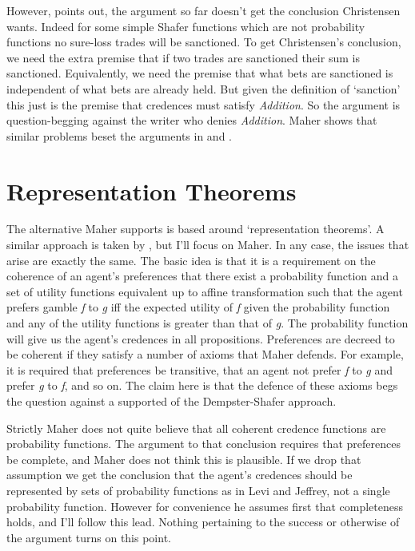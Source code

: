 However, \citet[301-3]{Maher1997} points out, the argument so far doesn't get the conclusion Christensen wants. Indeed for some simple Shafer functions which are not probability functions no sure\nobreakdash-loss trades will be sanctioned. To get Christensen's conclusion, we need the extra premise that if two trades are sanctioned their sum is sanctioned. Equivalently, we need the premise that what bets are sanctioned is independent of what bets are already held. But given the definition of `sanction' this just is the premise that credences must satisfy \textit{Addition}. So the argument is question-begging against the writer who denies \textit{Addition}. Maher shows that similar problems beset the arguments in \citet{HowsonUrbach1989} and \citet{Hellman1997}.

\section{Representation Theorems}
The alternative Maher supports is based around `representation theorems'. A similar approach is taken by \citet{Kaplan1996}, but I'll focus on Maher. In any case, the issues that arise are exactly the same. The basic idea is that it is a requirement on the coherence of an agent's preferences that there exist a probability function and a set of utility functions equivalent up to affine transformation such that the agent prefers gamble \textit{f} to \textit{g} iff the expected utility of \textit{f} given the probability function and any of the utility functions is greater than that of \textit{g}. The probability function will give us the agent's credences in all propositions. Preferences are decreed to be coherent if they satisfy a number of axioms that Maher defends. For example, it is required that preferences be transitive, that an agent not prefer \textit{f} to \textit{g} and prefer \textit{g} to \textit{f}, and so on. The claim here is that the defence of these axioms begs the question against a supported of the Dempster-Shafer approach.

Strictly Maher does not quite believe that all coherent credence functions are probability functions. The argument to that conclusion requires that preferences be complete, and Maher does not think this is plausible. If we drop that assumption we get the conclusion that the agent's credences should be represented by sets of probability functions as in Levi and Jeffrey, not a single probability function. However for convenience he assumes first that completeness holds, and I'll follow this lead. Nothing pertaining to the success or otherwise of the argument turns on this point.

